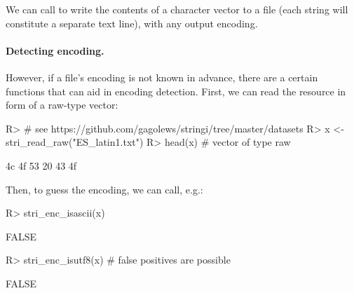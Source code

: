 \documentclass[nojss]{jss}
\begin{document}
We can call  to write the contents
of a character vector to a file (each string will
constitute a separate text line), with any output encoding.




\paragraph{Detecting encoding.}
However, if a file's encoding is not known in advance, there are
a certain functions that can aid in encoding detection.
First, we can read the resource in form of a raw-type vector:

%

\begin{Schunk}
\begin{Sinput}
R> # see https://github.com/gagolews/stringi/tree/master/datasets
R> x <- stri_read_raw("ES_latin1.txt")
R> head(x)  # vector of type raw
\end{Sinput}
\begin{Soutput}
[1] 4c 4f 53 20 43 4f
\end{Soutput}
\end{Schunk}

Then, to guess the encoding, we can call, e.g.:

\begin{Schunk}
\begin{Sinput}
R> stri_enc_isascii(x)
\end{Sinput}
\begin{Soutput}
[1] FALSE
\end{Soutput}
\begin{Sinput}
R> stri_enc_isutf8(x)   # false positives are possible
\end{Sinput}
\begin{Soutput}
[1] FALSE
\end{Soutput}
\end{Schunk}
\end{document}
